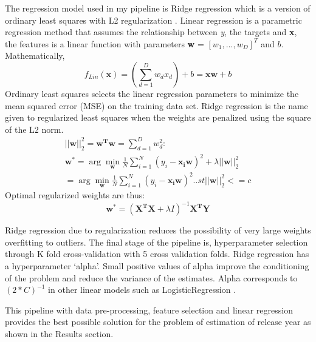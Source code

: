 \documentclass{article} %
\begin{document}
The regression model used in my pipeline is Ridge regression which is a version of ordinary least squares with L2 regularization \cite{slides}. Linear regression is a parametric regression method that assumes the relationship between \textit{y}, the targets and \textbf{x}, the features is a linear function with parameters \textbf{w} = $[w_1, ..., w_D]^T$ and $b$.
Mathematically,
\begin{equation*}
f_{Lin}(\boldsymbol{x}) = (\sum_{d=1}^{D}w_dx_d) + b = \boldsymbol{xw} + b
\end{equation*}
Ordinary least squares selects the linear regression parameters to minimize the mean squared error (MSE) on the training data set. Ridge regression is the name given to regularized least squares when the weights are penalized using the square of the L2 norm.
\begin{eqnarray*}
||\boldsymbol {w}||^2_2 = \boldsymbol{w^Tw} = \sum_{d=1}^{D}w^2_d: \\
\boldsymbol{w^*} = \arg \min_{\boldsymbol{w}} \frac{1}{N} \sum_{i=1}^{N} (y_i - \boldsymbol{x_iw})^2 + \lambda||\boldsymbol{w}||^2_2 \\
= \arg \min_{\boldsymbol{w}} \frac{1}{N} \sum_{i=1}^{N}(y_i - \boldsymbol{x_iw})^2 .. st ||\boldsymbol{w}||^2_2 <= c
\end{eqnarray*}
Optimal regularized weights are thus:
\begin{equation*}
\boldsymbol{w^*} = (\boldsymbol{X^TX} + \lambda I)^{-1}\boldsymbol{X^TY}
\end{equation*}

Ridge regression due to regularization reduces the possibility of very large weights overfitting to outliers. The final stage of the pipeline is, hyperparameter selection through K fold cross-validation with 5 cross validation folds. Ridge regression has a hyperparameter `alpha'. Small positive values of alpha improve the conditioning of the problem and reduce the variance of the estimates. Alpha corresponds to $(2*C)^{-1}$ in other linear models such as LogisticRegression \cite{sklearn_ridge}. 

This pipeline with data pre-processing, feature selection and linear regression provides the best possible solution for the problem of estimation of release year as shown in the Results section.
\end{document}

